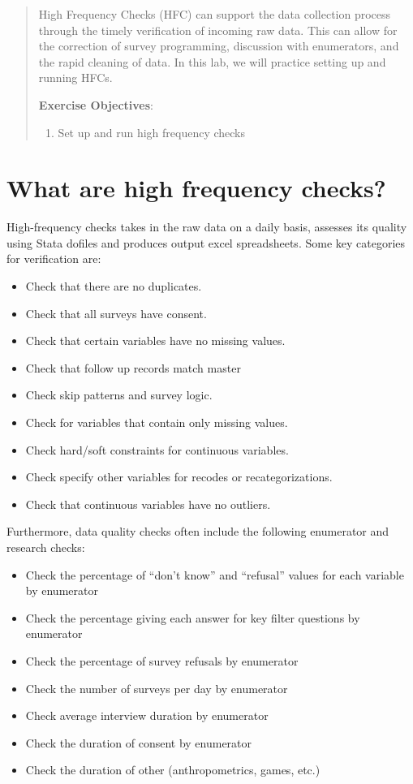 \documentclass{tufte-handout}
\begin{document}
\begin{abstract}
High Frequency Checks (HFC) can support the data collection process
through the timely verification of incoming raw data.
This can allow for the correction of survey programming,
discussion with enumerators, and the rapid cleaning of data.
In this lab, we will practice setting up and running HFCs.

\bigskip\noindent \textbf{Exercise Objectives}:
\begin{enumerate}
  \item Set up and run high frequency checks
\end{enumerate}
\end{abstract}

\section{What are high frequency checks?}

High-frequency checks takes in the raw data on a daily basis,
assesses its quality using Stata dofiles
and produces output excel spreadsheets.
Some key categories for verification are:

\begin{itemize}
  \item Check that there are no duplicates.
  \item Check that all surveys have consent.
  \item Check that certain variables have no missing values.
  \item Check that follow up records match master
  \item Check skip patterns and survey logic.
  \item Check for variables that contain only missing values.
  \item Check hard/soft constraints for continuous variables.
  \item Check specify other variables for recodes or recategorizations.
  \item Check that continuous variables have no outliers.
\end{itemize}

Furthermore, data quality checks often include the following enumerator and research checks:

\begin{itemize}
  \item Check the percentage of “don’t know” and “refusal” values for each variable by
enumerator
  \item Check the percentage giving each answer for key filter questions by enumerator
  \item Check the percentage of survey refusals by enumerator
  \item Check the number of surveys per day by enumerator
  \item Check average interview duration by enumerator
  \item Check the duration of consent by enumerator
  \item Check the duration of other (anthropometrics, games, etc.)
\end{itemize}
\end{document}
